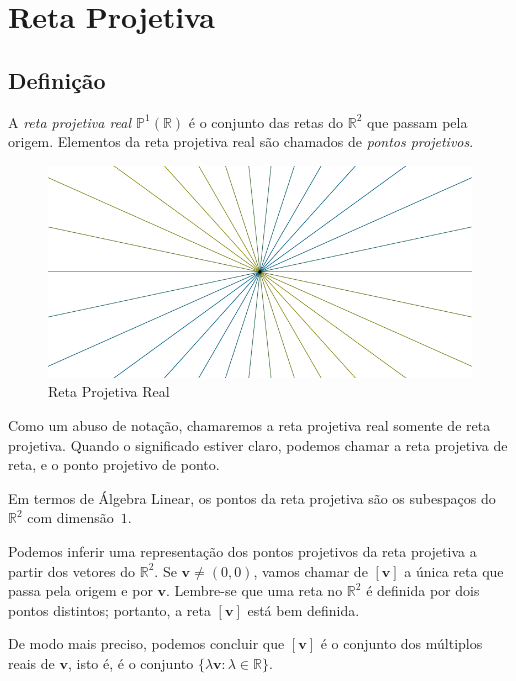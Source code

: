 \chapter{Reta Projetiva}

\section{Definição}

\begin{defn}
A \emph{reta projetiva real \(\mathbb{P}^1(\mathbb{R})\)} é o conjunto das retas do \(\mathbb{R}^2\) que passam pela origem.
Elementos da reta projetiva real são chamados de \emph{pontos projetivos}.
\end{defn}

\begin{figure}[hbtp]
  \centering
  \includegraphics{figures/retaprojetiva.pdf}
  \caption{Reta Projetiva Real}
\end{figure}

Como um abuso de notação, chamaremos a reta projetiva real somente de reta projetiva.
Quando o significado estiver claro, podemos chamar a reta projetiva de reta, e o ponto projetivo de ponto.

Em termos de Álgebra Linear, os pontos da reta projetiva são os subespaços do $\mathbb{R}^2$ com dimensão~$1$.

Podemos inferir uma representação dos pontos projetivos da reta projetiva a partir dos vetores do \(\mathbb{R}^2\).
Se \(\mathbf{v} \neq (0, 0)\), vamos chamar de \([\mathbf{v}]\) a única reta que passa pela origem e por \(\mathbf{v}\).
Lembre-se que uma reta no \(\mathbb{R}^2\) é definida por dois pontos distintos; portanto, a reta \([\mathbf{v}]\) está bem definida.

De modo mais preciso, podemos concluir que \([\mathbf{v}]\) é o conjunto dos múltiplos reais de \(\mathbf{v}\), isto é, é o conjunto \(\{ \lambda \mathbf{v} : \lambda \in \mathbb{R}\}\).

